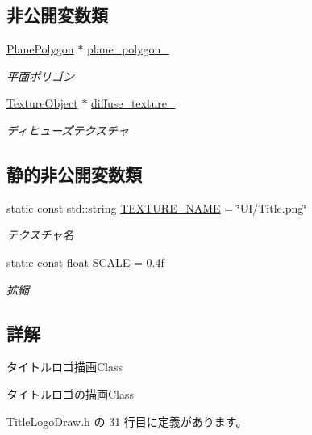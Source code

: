 \subsection*{非公開変数類}
\begin{DoxyCompactItemize}
\item 
\mbox{\hyperlink{class_plane_polygon}{Plane\+Polygon}} $\ast$ \mbox{\hyperlink{class_title_logo_draw_a6088671088940a3580805df34c49cc52}{plane\+\_\+polygon\+\_\+}}
\begin{DoxyCompactList}\small\item\em 平面ポリゴン \end{DoxyCompactList}\item 
\mbox{\hyperlink{class_texture_object}{Texture\+Object}} $\ast$ \mbox{\hyperlink{class_title_logo_draw_aa5a69465f7847bae2e449b9d8ac71479}{diffuse\+\_\+texture\+\_\+}}
\begin{DoxyCompactList}\small\item\em ディヒューズテクスチャ \end{DoxyCompactList}\end{DoxyCompactItemize}
\subsection*{静的非公開変数類}
\begin{DoxyCompactItemize}
\item 
static const std\+::string \mbox{\hyperlink{class_title_logo_draw_a663026976213673c6bcc66533b89ffa1}{T\+E\+X\+T\+U\+R\+E\+\_\+\+N\+A\+ME}} = \char`\"{}UI/Title.\+png\char`\"{}
\begin{DoxyCompactList}\small\item\em テクスチャ名 \end{DoxyCompactList}\item 
static const float \mbox{\hyperlink{class_title_logo_draw_a22181b94dc000a9fb9f68a21af9523ab}{S\+C\+A\+LE}} = 0.\+4f
\begin{DoxyCompactList}\small\item\em 拡縮 \end{DoxyCompactList}\end{DoxyCompactItemize}


\subsection{詳解}
タイトルロゴ描画\+Class 

タイトルロゴの描画\+Class 

 Title\+Logo\+Draw.\+h の 31 行目に定義があります。



